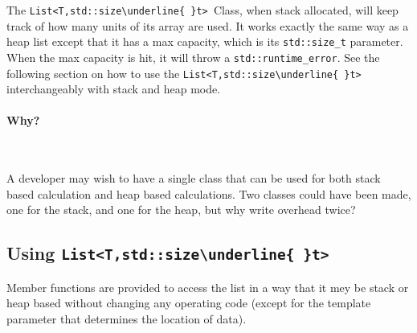 \documentclass{article}
\newcommand{\theobj}{\protect\Verb+List<T,std::size\underline{ }t> +}
\begin{document}
The \theobj Class, when stack allocated, will keep track of how many units of its array are used.  It works exactly the same way as a heap list except that it has a max capacity, which is its \Verb+std::size_t+ parameter.  When the max capacity is hit, it will throw a \Verb+std::runtime_error+.  See the following section on how to use the \theobj interchangeably with stack and heap mode.
\paragraph{Why?} \hfill \\
\par
A developer may wish to have a single class that can be used for both stack based calculation and heap based calculations.  Two classes could have been made, one for the stack, and one for the heap, but why write overhead twice?

\subsection{Using \theobj}

Member functions are provided to access the list in a way that it mey be stack or heap based without changing any operating code (except for the template parameter that determines the location of data).
\end{document}
